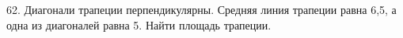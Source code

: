 62. Диагонали трапеции перпендикулярны. Средняя линия трапеции равна 6,5, а одна из диагоналей равна 5. Найти площадь трапеции.\\
